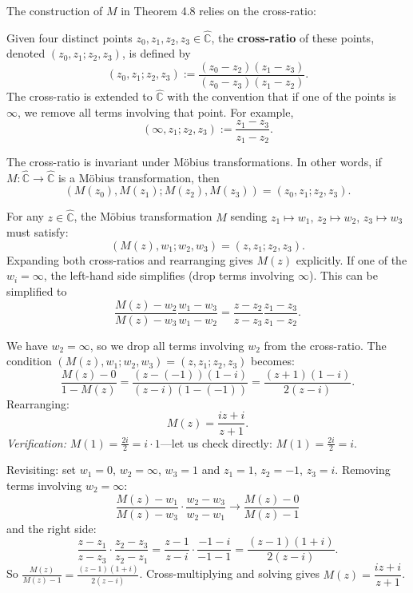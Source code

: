 \documentclass[11pt, a4paper]{article}
\begin{document}
The construction of $M$ in Theorem 4.8 relies on the cross-ratio:

\begin{defbox}
Given four distinct points $z_0,z_1,z_2,z_3\in\hat{\mathbb{C}}$, the \textbf{cross-ratio} of these points, denoted $(z_0,z_1;z_2,z_3)$, is defined by
\[
  (z_0,z_1;z_2,z_3) := \frac{(z_0-z_2)(z_1-z_3)}{(z_0-z_3)(z_1-z_2)}.
\]
The cross-ratio is extended to $\hat{\mathbb{C}}$ with the convention that if one of the points is $\infty$, we remove all terms involving that point. For example,
\[
  (\infty,z_1;z_2,z_3) := \frac{z_1-z_3}{z_1-z_2}.
\]
\end{defbox}

\begin{thmbox}
    The cross-ratio is invariant under M\"obius transformations. In other words, if $M:\hat{\mathbb{C}}\to\hat{\mathbb{C}}$ is a M\"obius transformation, then
    \[
    (M(z_0),M(z_1);M(z_2),M(z_3)) = (z_0,z_1;z_2,z_3).
    \]
\end{thmbox}

\begin{methodbox}
    For any $z\in\hat{\mathbb{C}}$, the M\"obius transformation $M$ sending $z_1\mapsto w_1,\,z_2\mapsto w_2,\,z_3\mapsto w_3$ must satisfy:
    \[
    (M(z), w_1; w_2, w_3) = (z, z_1; z_2, z_3).
    \]
    Expanding both cross-ratios and rearranging gives $M(z)$ explicitly. If one of the $w_i=\infty$, the left-hand side simplifies (drop terms involving $\infty$).
    This can be simplified to
    \[
    \frac{M(z) - w_2}{M(z) - w_3}\frac{w_1 - w_3}{w_1 - w_2} = \frac{z - z_2}{z - z_3}\frac{z_1 - z_3}{z_1 - z_2}.
    \]
\end{methodbox}

\begin{exbox}
We have $w_2=\infty$, so we drop all terms involving $w_2$ from the cross-ratio. The condition $(M(z),w_1;w_2,w_3)=(z,z_1;z_2,z_3)$ becomes:
\[
  \frac{M(z)-0}{1-M(z)} = \frac{(z-(-1))(1-i)}{(z-i)(1-(-1))} = \frac{(z+1)(1-i)}{2(z-i)}.
\]
Rearranging:
\[
  M(z) = \frac{iz+i}{z+1}.
\]
\textit{Verification:} $M(1)=\frac{2i}{2}=i\cdot 1$---let us check directly: $M(1)=\frac{2i}{2}=i$. 

Revisiting: set $w_1=0$, $w_2=\infty$, $w_3=1$ and $z_1=1$, $z_2=-1$, $z_3=i$. Removing terms involving $w_2=\infty$:
\[
  \frac{M(z)-w_1}{M(z)-w_3}\cdot\frac{w_2-w_3}{w_2-w_1} \longrightarrow \frac{M(z)-0}{M(z)-1}
\]
and the right side:
\[
  \frac{z-z_1}{z-z_3}\cdot\frac{z_2-z_3}{z_2-z_1} = \frac{z-1}{z-i}\cdot\frac{-1-i}{-1-1} = \frac{(z-1)(1+i)}{2(z-i)}.
\]
So $\frac{M(z)}{M(z)-1}=\frac{(z-1)(1+i)}{2(z-i)}$. Cross-multiplying and solving gives $\boxed{M(z)=\dfrac{iz+i}{z+1}}$.
\end{exbox}
\end{document}

